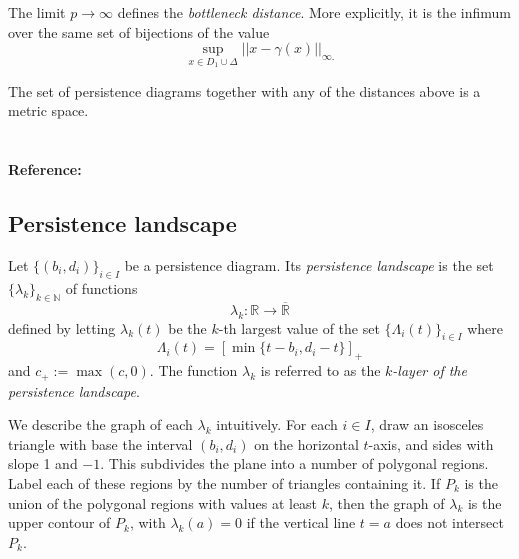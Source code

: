\documentclass{amsart}
\begin{document}
	The limit $p \to \infty$ defines the \textit{bottleneck distance}. More explicitly, it is the infimum over the same set of bijections of the value
	\begin{equation*}
	\sup_{x \in D_1 \cup \Delta} ||x - \gamma(x)||_{\infty.}
	\end{equation*}

	The set of persistence diagrams together with any of the distances above is a
	metric space.
	
	\paragraph{\\ Reference:} \cite{kerber2017geometry}
	
	\subsection*{Persistence landscape} \label{persistence_landscape}	
	
	Let $\{(b_i, d_i)\}_{i \in I}$ be a 
	persistence diagram. Its \textit{persistence landscape} is the set $\{\lambda_k\}_{k \in \mathbb N}$ of functions	
	\begin{equation*}	
	\lambda_k : \mathbb R \to \overline{\mathbb R}	
	\end{equation*}	
	defined by letting $\lambda_k(t)$ be the $k$-th largest value of the set $\{\Lambda_i(t)\}_ {i \in I}$ where	
	\begin{equation*}	
	\Lambda_i(t) = \left[ \min \{t-b_i, d_i-t\}\right]_+	
	\end{equation*}	
	and $c_+ := \max(c,0)$. The function $\lambda_k$ is referred to as the \textit{$k$-layer of the persistence landscape}.
	
	We describe the graph of each $\lambda_k$ intuitively. For each $i \in I$, draw an isosceles triangle with base the interval $(b_i, d_i)$ on the horizontal $t$-axis, and sides with slope 1 and $-1$. This subdivides the plane into a number of polygonal regions. Label each of these regions by the number of triangles containing it. If $P_k$ is the union of the polygonal regions with values at least $k$, then the graph of $\lambda_k$ is the upper contour of $P_k$, with $\lambda_k(a) = 0$ if the vertical line $t=a$ does not intersect $P_k$.
	
\end{document}
